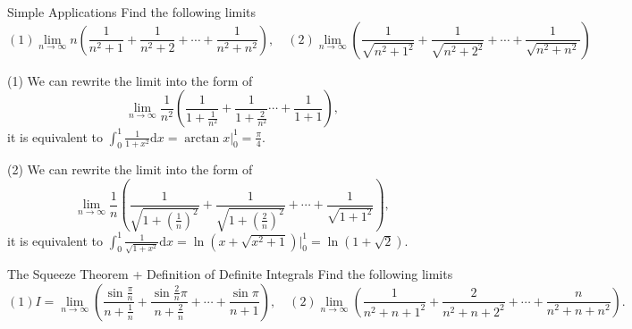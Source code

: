 \begin{example}{Simple Applications}{}
  Find the following limits
  \begin{equation}
    (1) \lim \limits _{n \rightarrow \infty} n \left( \frac{1}{n^2 + 1} + \frac{1}{n^2 + 2} + \cdots + \frac{1}{n^2 + n^2} \right), \quad
    (2) \lim \limits _{n \rightarrow \infty}  \left( \frac{1}{\sqrt{n^2 + 1^2}} + \frac{1}{\sqrt{n^2 + 2^2}} + \cdots + \frac{1}{\sqrt{n^2 + n^2}} \right)
  \end{equation}
\end{example}

\begin{solution}
  (1) We can rewrite the limit into the form of
  \begin{equation}
    \lim \limits _{n \rightarrow \infty} \frac{1}{n^2} \left( \frac{1}{1 + \frac{1}{n^2}} + \frac{1}{1 + \frac{2}{n^2}} \cdots + \frac{1}{1 + 1} \right),
  \end{equation}
  it is equivalent to $\int_0^1 \frac{1}{1 + x^2} \mathrm{d} x = \arctan x
  \big|^1_0 = \frac{\pi}{4}$.

  (2) We can rewrite the limit into the form of
  \begin{equation}
    \lim \limits _{n \rightarrow \infty} \frac{1}{n} \left( \frac{1}{\sqrt{1 + (\frac{1}{n})^2}} + \frac{1}{\sqrt{1 + (\frac{2}{n})^2}} + \cdots + \frac{1}{\sqrt{1 + 1^2}} \right),
  \end{equation}
  it is equivalent to $\int_0^1 \frac{1}{\sqrt{1 + x^2}}\mathrm{d} x = \ln (x +
  \sqrt{x^2 + 1}) \big|^1_0 = \ln (1 + \sqrt{2})$.
\end{solution}

\begin{example}{The Squeeze Theorem + Definition of Definite Integrals}{}
  Find the following limits
  \begin{equation}
    (1) I = \lim \limits _{n \rightarrow \infty} \left( \frac{\sin \frac{\pi}{n}}{n + \frac{1}{n}} + \frac{\sin \frac{2}{n}\pi}{n + \frac{2}{n}} + \cdots + \frac{\sin \pi}{n + 1} \right), \quad
    (2) \lim \limits _{n \rightarrow \infty} \left( \frac{1}{n^2 + n + 1^2} + \frac{2}{n^2 + n + 2^2} + \cdots + \frac{n}{n^2 + n + n^2}\right).
  \end{equation}
\end{example}




